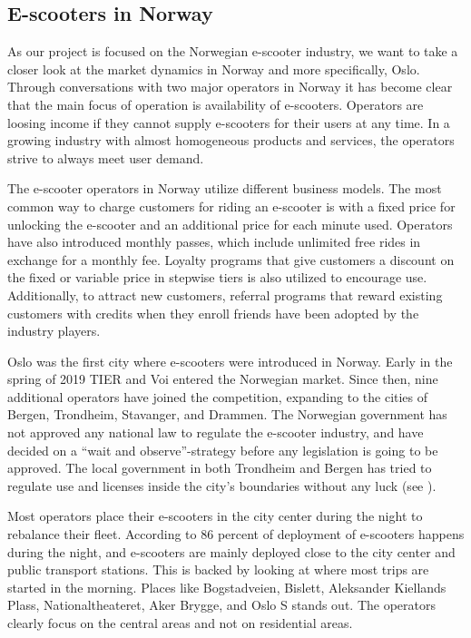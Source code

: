\subsection{E-scooters in Norway}\label{e-scooters in norway}
As our project is focused on the Norwegian e-scooter industry, we want to take a closer look at the market dynamics in Norway and more specifically, Oslo. Through conversations with two major operators in Norway it has become clear that the main focus of operation is availability of e-scooters. Operators are loosing income if they cannot supply e-scooters for their users at any time. In a growing industry with almost homogeneous products and services, the operators strive to always meet user demand.

The e-scooter operators in Norway utilize different business models. The most common way to charge customers for riding an e-scooter is with a fixed price for unlocking the e-scooter and an additional  price for each minute used. Operators have also introduced monthly passes, which include unlimited free rides in exchange for a monthly fee. Loyalty programs that give customers a discount on the fixed or variable price in stepwise tiers is also utilized to encourage use. Additionally, to attract new customers, referral programs that reward existing customers with credits when they enroll friends have been adopted by the industry players.

Oslo was the first city where e-scooters were introduced in Norway. Early in the spring of 2019 TIER and Voi entered the Norwegian market. Since then, nine additional operators have joined the competition, expanding to the cities of Bergen, Trondheim, Stavanger, and Drammen. The Norwegian government has not approved any national law to regulate the e-scooter industry, and have decided on a “wait and observe”-strategy before any legislation is going to be approved. The local government in both Trondheim and Bergen has tried to regulate use and licenses inside the city's boundaries without any luck (see ).  

Most operators place their e-scooters in the city center during the night to rebalance their fleet. According to \citet{fearnley_delte_2020} 86 percent of deployment of e-scooters happens during the night, and e-scooters are mainly deployed close to the city center and public transport stations. This is backed by looking at where most trips are started in the morning. Places like Bogstadveien, Bislett, Aleksander Kiellands Plass, Nationaltheateret, Aker Brygge, and Oslo S stands out. The operators clearly focus on the central areas and not on residential areas.

